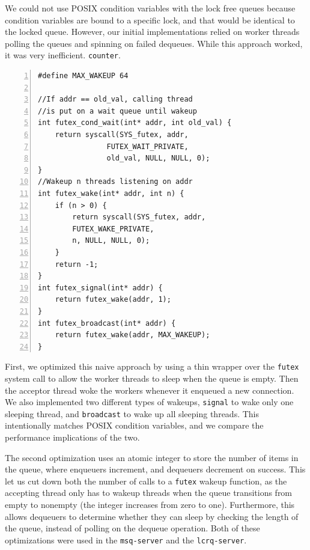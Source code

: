 \documentclass[twoside,10pt]{article}
\begin{document}
\begin{multicols}{2}
We could not use POSIX condition variables with the lock free queues
because condition variables are bound to a specific lock, and that
would be identical to the locked queue. However, our initial
implementations relied on worker threads polling the queues and
spinning on failed dequeues. While this approach worked, it was very
inefficient. 
\verb+counter+.
\begin{Verbatim}[numbers=left,
                 fontsize=\small]
#define MAX_WAKEUP 64

//If addr == old_val, calling thread
//is put on a wait queue until wakeup
int futex_cond_wait(int* addr, int old_val) {
    return syscall(SYS_futex, addr, 
                FUTEX_WAIT_PRIVATE, 
                old_val, NULL, NULL, 0); 
}
//Wakeup n threads listening on addr
int futex_wake(int* addr, int n) {
    if (n > 0) {
        return syscall(SYS_futex, addr, 
        FUTEX_WAKE_PRIVATE, 
        n, NULL, NULL, 0); 
    }
    return -1;
}
int futex_signal(int* addr) {
    return futex_wake(addr, 1); 
}
int futex_broadcast(int* addr) {
    return futex_wake(addr, MAX_WAKEUP); 
}
\end{Verbatim}

First, we optimized this naive approach by using a thin
wrapper over the \verb+futex+ system call to allow the worker threads
to sleep when the queue is empty. Then the acceptor thread woke the
workers whenever it enqueued a new connection.  We also implemented
two different types of wakeups, \verb+signal+ to wake only one
sleeping thread, and \verb+broadcast+ to wake up all sleeping threads.
This intentionally matches POSIX condition variables, and we compare
the performance implications of the two. 

The second optimization uses
an atomic integer to store the number of items in the queue, where
enqueuers increment, and dequeuers decrement on success. This let us
cut down both the number of calls to a \verb+futex+ wakeup function,
as the accepting thread only has to wakeup threads when the queue
transitions from empty to nonempty (the integer increases from zero to
one). Furthermore, this allows dequeuers to determine whether they can
sleep by checking the length of the queue, instead of polling on the
dequeue operation. Both of these optimizations were used in the
\verb+msq-server+ and the \verb+lcrq-server+. 


\end{multicols}
\end{document}

